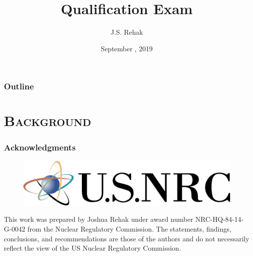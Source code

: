 \documentclass[xcolor=x11names, compress]{beamer}
\title{Qualification Exam}
\author{J.S. Rehak}
\date{September \nth{4}, 2019}
\begin{document}


\begin{frame}
  \frametitle{Outline}
  \tableofcontents
\end{frame}

\section{\scshape Background}


\begin{frame}
  \frametitle{Acknowledgments}
  \begin{figure}[h!]
    \centering
    \includegraphics[scale=0.4]{images/nrc}
  \end{figure}\centering
  \small This work was prepared by Joshua Rehak under award number
  NRC-HQ-84-14-G-0042 from the Nuclear Regulatory Commission. The
  statements, findings, conclusions, and recommendations are those of
  the authors and do not necessarily reflect the view of the US
  Nuclear Regulatory Commission.
\end{frame}

\appendix

\end{document}
